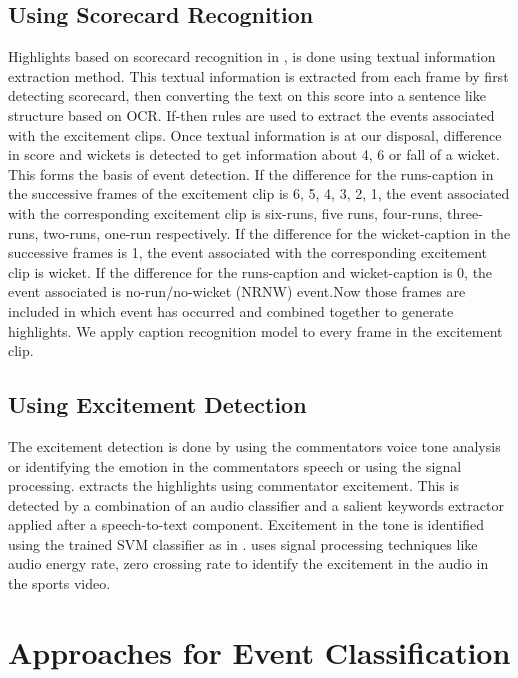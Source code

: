 \subsection{Using Scorecard Recognition}
Highlights based on scorecard recognition in \cite{6731340}, \cite{canalysis} is done using textual information extraction method. This textual information is extracted from each frame by first detecting scorecard, then converting the text on this score into a sentence like structure based on OCR. If-then rules are used to extract the events associated with the excitement clips. Once textual information is at our disposal, difference in score and wickets is detected to get information about 4, 6 or fall of a wicket. This forms the basis of event detection. If the difference for the runs-caption in the successive frames of the excitement clip is 6, 5, 4, 3, 2, 1, the event associated with the corresponding excitement clip is six-runs, five runs, four-runs, three-runs, two-runs, one-run respectively. If the difference for the wicket-caption in the successive frames is 1, the event associated with the corresponding excitement clip is wicket. If the difference for the runs-caption and wicket-caption is 0, the event associated is no-run/no-wicket (NRNW) event.Now those frames are included in which event has occurred and combined together to generate highlights. 
We apply caption recognition model to every frame in the excitement clip.
\subsection{Using Excitement Detection}
The excitement detection is done by using the commentator\textquotesingle s voice tone analysis or identifying the emotion in the commentator\textquotesingle s speech or using the signal processing.
\cite{8491305} extracts the highlights using commentator excitement. This is detected by a combination of an audio classiﬁer and a salient keywords extractor applied after a speech-to-text component. Excitement in the tone is identified using the trained SVM classifier as in \cite{8491305}. \cite{4756096} uses signal processing techniques like audio energy rate, zero crossing rate to identify the excitement in the audio in the sports video.
\section{Approaches for Event Classification}
